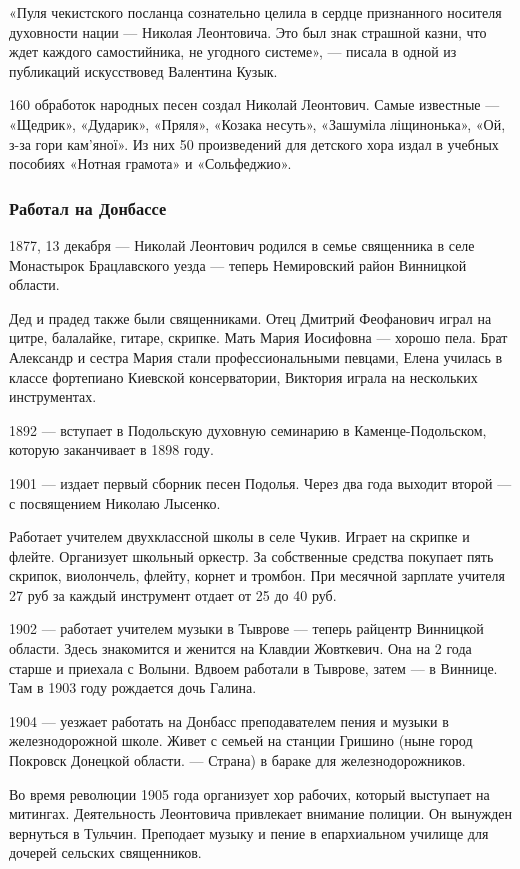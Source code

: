 «Пуля чекистского посланца сознательно целила в сердце признанного носителя
духовности нации — Николая Леонтовича. Это был знак страшной казни, что ждет
каждого самостийника, не угодного системе», — писала в одной из публикаций
искусствовед Валентина Кузык.

160 обработок народных песен создал Николай Леонтович. Самые известные —
«Щедрик», «Дударик», «Пряля», «Козака несуть», «Зашуміла ліщинонька», «Ой, з-за
гори кам'яної». Из них 50 произведений для детского хора издал в учебных
пособиях «Нотная грамота» и «Сольфеджио».

\subsubsection{Работал на Донбассе}

1877, 13 декабря — Николай Леонтович родился в семье священника в селе
Монастырок Брацлавского уезда — теперь Немировский район Винницкой области.

Дед и прадед также были священниками. Отец Дмитрий Феофанович играл на цитре,
балалайке, гитаре, скрипке. Мать Мария Иосифовна — хорошо пела. Брат Александр
и сестра Мария стали профессиональными певцами, Елена училась в классе
фортепиано Киевской консерватории, Виктория играла на нескольких инструментах.

1892 — вступает в Подольскую духовную семинарию в Каменце-Подольском, которую
заканчивает в 1898 году.

1901 — издает первый сборник песен Подолья. Через два года выходит второй — с
посвящением Николаю Лысенко.

Работает учителем двухклассной школы в селе Чукив. Играет на скрипке и флейте.
Организует школьный оркестр. За собственные средства покупает пять скрипок,
виолончель, флейту, корнет и тромбон. При месячной зарплате учителя 27 руб за
каждый инструмент отдает от 25 до 40 руб.

1902 — работает учителем музыки в Тыврове — теперь райцентр Винницкой области.
Здесь знакомится и женится на Клавдии Жовткевич. Она на 2 года старше и
приехала с Волыни. Вдвоем работали в Тыврове, затем — в Виннице. Там в 1903
году рождается дочь Галина.

1904 — уезжает работать на Донбасс преподавателем пения и музыки в
железнодорожной школе. Живет с семьей на станции Гришино (ныне город Покровск
Донецкой области. — Страна) в бараке для железнодорожников.

Во время революции 1905 года организует хор рабочих, который выступает на
митингах. Деятельность Леонтовича привлекает внимание полиции. Он вынужден
вернуться в Тульчин. Преподает музыку и пение в епархиальном училище для
дочерей сельских священников.

